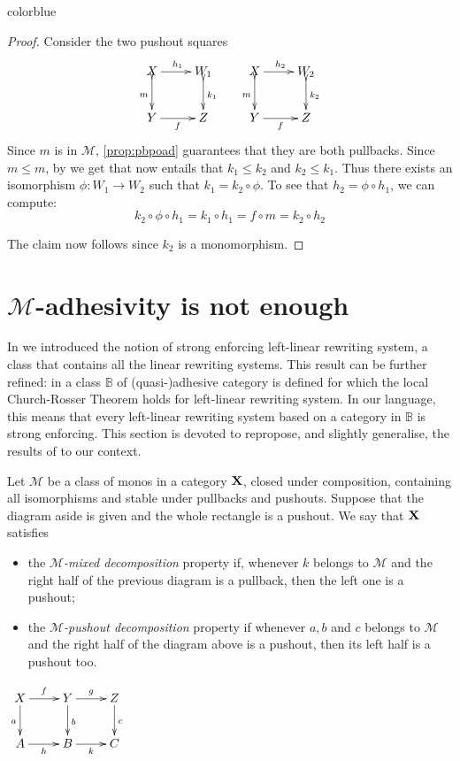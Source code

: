 \documentclass[a4paper,UKenglish,cleveref,pdftex,thm-restate,numberwithinsect]{lipics-v2021}
\newcommand{\full}[1]{{color{blue}#1}}
\newcommand{\full}[1]{}
\def\X{\textbf {\textup{X}}}
\def\Y{\textbf {\textup{Y}}}
\begin{document}
\full{ 
\begin{proof}
	Consider the two pushout squares
	\[\xymatrix{X \ar[r]^{h_1}\ar@{>->}[d]_{m}& W_1 \ar@{>->}[d]^{k_1} & X \ar@{>->}[d]_{m} \ar[r]^{h_2}& W_2 \ar@{>->}[d]^{k_2}\\Y\ar[r]_{f}&Z &Y \ar[r]_{f}&Z}\]
	Since $m$ is in $\mathcal{M}$, \cref{prop:pbpoad} guarantees that they are both pullbacks.
	Since $m\leq m$, by \Cref{lem:radj} we get that now entails that $k_1\leq k_2$ and $k_2\leq k_1$. Thus there exists an isomorphism $\phi\colon W_1\to W_2$ such that $k_1=k_2\circ \phi$. To see that $h_2=\phi\circ h_1$, we can compute:
	\[
		k_2\circ \phi \circ h_1  = k_1\circ h_1= f\circ m= k_2\circ h_2\]

	The claim now follows since $k_2$ is a monomorphism.
\end{proof}}



\section{$\mathcal{M}$-adhesivity is not enough}\label{app:fill}
In  we introduced the notion of strong enforcing left-linear rewriting system, a class that contains all the linear rewriting systems. This result can be further refined: in \cite{baldan2011adhesivity} a class  $\mathbb{B}$ of (quasi-)adhesive category is defined for which the local Church-Rosser Theorem holds for left-linear rewriting system. In our language, this means that every left-linear rewriting system based on a category in $\mathbb{B}$ is strong enforcing. This section is devoted to repropose, and slightly generalise, the results of \cite{baldan2011adhesivity} to our context.

\noindent
\parbox{10.4cm}{
	\begin{definition}Let $\mathcal{M}$ be a class of monos in a category $\X$, closed under composition, containing all isomorphisms and stable under pullbacks and pushouts. Suppose that the  diagram aside is given and the whole rectangle is a pushout. We say that $\X$ satisfies
		\parbox{14cm}{\begin{itemize}
				\item the \emph{$\mathcal{M}$-mixed decomposition} property if, whenever $k$ belongs to $\mathcal{M}$ and the right half of the previous diagram is a pullback, then the left one is a pushout;
				\item the \emph{$\mathcal{M}$-pushout decomposition} property if whenever $a, b$ and $c$ belongs to $\mathcal{M}$ and the right half of the diagram above is a pushout, then its left half is a pushout too.
			\end{itemize}}
	\end{definition}} \parbox{3cm}{\vspace{-2cm}$\xymatrix{X \ar[d]_{a} \ar[r]^{f}& \ar[r]^{g} Y \ar[d]^{b}& Z \ar[d]^{c}\\ A \ar[r]_{h}& B \ar[r]_{k}& C}$}\\
\end{document}
